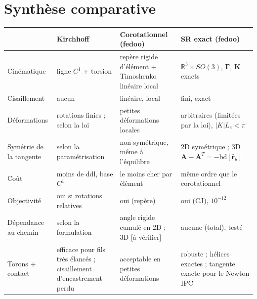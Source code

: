 \documentclass[11pt,a4paper]{article}
\newcommand{\hatv}[1]{\widehat{\bm{#1}}}
\newcommand{\Gam}{\bm{\Gamma}}
\newcommand{\Kv}{\mathbf{K}}
\newcommand{\averif}{\textcolor{orange!80!black}{[à vérifier]}}
\begin{document}
\section{Synthèse comparative}
\begin{center}
\small
\begin{tabularx}{\linewidth}{>{\raggedright}p{2.6cm}>{\raggedright}X>{\raggedright}X>{\raggedright\arraybackslash}X}
\toprule
 & Kirchhoff & Corotationnel (fedoo) & SR exact (fedoo)\\
\midrule
Cinématique & ligne $C^1$ + torsion & repère rigide d'élément + Timoshenko linéaire local & $\mathbb R^3\times SO(3)$, $\Gam$, $\Kv$ exacts\\
Cisaillement & aucun & linéaire, local & fini, exact\\
Déformations & rotations finies ; selon la loi & petites déformations locales & arbitraires (limitées par la loi), $|K|L_e<\pi$\\
Symétrie de la tangente & selon la paramétrisation & non symétrique, même à l'équilibre & 2D symétrique ; 3D $\mathbf A-\mathbf A^T=-\mathrm{bd}[\hatv r_\theta]$\\
Coût & moins de ddl, base $C^1$ & le moins cher par élément & même ordre que le corotationnel\\
Objectivité & oui si rotations relatives \cite{meier2014} & oui (repère) & oui (CJ), $10^{-12}$\\
Dépendance au chemin & selon la formulation & angle rigide cumulé en 2D ; 3D \averif & aucune (total), testé\\
Torons + contact & efficace pour fils très élancés \cite{costello1997} ; cisaillement d'encastrement perdu & acceptable en petites déformations & robuste ; hélices exactes ; tangente exacte pour le Newton IPC\\
\bottomrule
\end{tabularx}
\end{center}

\end{document}
